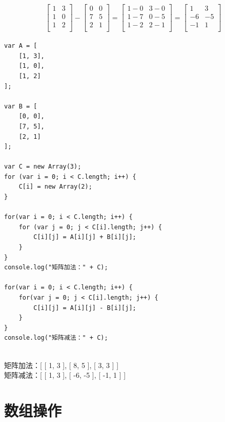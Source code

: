 \begin{align}\nonumber
	\left[\begin{matrix}
			1 & 3 \\
			1 & 0 \\
			1 & 2 \\
		\end{matrix} \right]
	-
	\left[\begin{matrix}
			0 & 0 \\
			7 & 5 \\
			2 & 1 \\
		\end{matrix} \right]
	=
	\left[\begin{matrix}
			1-0 & 3-0 \\
			1-7 & 0-5 \\
			1-2 & 2-1 \\
		\end{matrix} \right]
	=
	\left[\begin{matrix}
			1  & 3  \\
			-6 & -5 \\
			-1 & 1  \\
		\end{matrix} \right]
\end{align}

\begin{lstlisting}[style=htmlcssjs]
var A = [
    [1, 3],
    [1, 0],
    [1, 2]
];
    
var B = [
    [0, 0],
    [7, 5],
    [2, 1]
];

var C = new Array(3);
for (var i = 0; i < C.length; i++) {
    C[i] = new Array(2);
}

for(var i = 0; i < C.length; i++) {
    for (var j = 0; j < C[i].length; j++) {
        C[i][j] = A[i][j] + B[i][j];
    }
}
console.log("矩阵加法：" + C);

for(var i = 0; i < C.length; i++) {
    for(var j = 0; j < C[i].length; j++) {
        C[i][j] = A[i][j] - B[i][j];
    }
}
console.log("矩阵减法：" + C);
\end{lstlisting}

\begin{tcolorbox}
	 \\
	矩阵加法：[ [ 1, 3 ], [ 8, 5 ], [ 3, 3 ] ] \\
	矩阵减法：[ [ 1, 3 ], [ -6, -5 ], [ -1, 1 ] ]
\end{tcolorbox}

\newpage

\section{数组操作}

